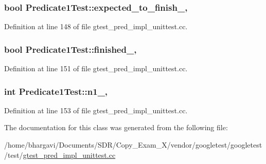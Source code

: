 \subsubsection[{\texorpdfstring{expected\+\_\+to\+\_\+finish\+\_\+}{expected_to_finish_}}]{\setlength{\rightskip}{0pt plus 5cm}bool Predicate1\+Test\+::expected\+\_\+to\+\_\+finish\+\_\+\hspace{0.3cm}{\ttfamily [static]}, {\ttfamily [protected]}}\hypertarget{class_predicate1_test_ad91cfa58e6352d53abacce32df2ef635}{}\label{class_predicate1_test_ad91cfa58e6352d53abacce32df2ef635}


Definition at line 148 of file gtest\+\_\+pred\+\_\+impl\+\_\+unittest.\+cc.

\subsubsection[{\texorpdfstring{finished\+\_\+}{finished_}}]{\setlength{\rightskip}{0pt plus 5cm}bool Predicate1\+Test\+::finished\+\_\+\hspace{0.3cm}{\ttfamily [static]}, {\ttfamily [protected]}}\hypertarget{class_predicate1_test_a6d45fb2d1f01a5c8baf28f60039c244e}{}\label{class_predicate1_test_a6d45fb2d1f01a5c8baf28f60039c244e}


Definition at line 151 of file gtest\+\_\+pred\+\_\+impl\+\_\+unittest.\+cc.

\subsubsection[{\texorpdfstring{n1\+\_\+}{n1_}}]{\setlength{\rightskip}{0pt plus 5cm}int Predicate1\+Test\+::n1\+\_\+\hspace{0.3cm}{\ttfamily [static]}, {\ttfamily [protected]}}\hypertarget{class_predicate1_test_a528d9f7f618b17802962a3824eea11e3}{}\label{class_predicate1_test_a528d9f7f618b17802962a3824eea11e3}


Definition at line 153 of file gtest\+\_\+pred\+\_\+impl\+\_\+unittest.\+cc.



The documentation for this class was generated from the following file\+:\begin{DoxyCompactItemize}
\item 
/home/bhargavi/\+Documents/\+S\+D\+R/\+Copy\+\_\+\+Exam\+\_\+X/vendor/googletest/googletest/test/\hyperlink{gtest__pred__impl__unittest_8cc}{gtest\+\_\+pred\+\_\+impl\+\_\+unittest.\+cc}\end{DoxyCompactItemize}
